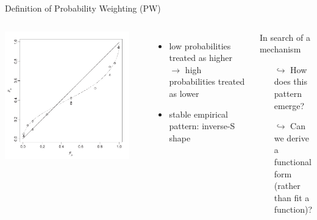 \begin{frame}{Definition of Probability Weighting (PW)}

\begin{columns}[T]
	\includegraphics[width=.9\textwidth]{../../figs/TK1992.pdf}

\parencite[p. 310, Fig. 1,relabelled axes]{TverskyKahneman1992}

\begin{itemize}
  \item low probabilities treated as higher $\rightarrow$ high probabilities treated as lower
  \item stable empirical pattern: inverse-S shape
\end{itemize}

\bi
	\item	{}
\ei

\begin{block}{In search of a mechanism}
	\begin{itemize}
	  \item[$\hookrightarrow$] How does this pattern emerge?
  	\item[$\hookrightarrow$] Can we derive a functional form\\ 
	(rather than fit a function)?
	\end{itemize}
\end{block}

\end{columns}
\end{frame}

